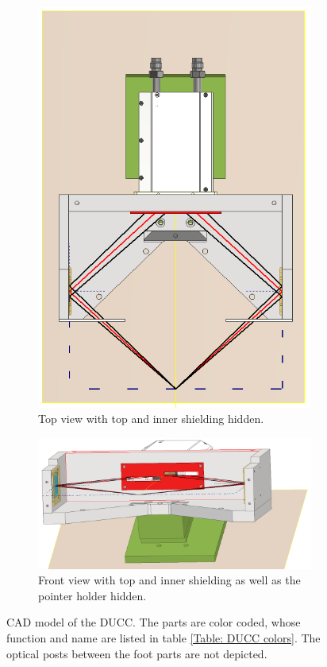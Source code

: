 \begin{figure} [H]
\begin{subfigure}[t]{0.35\textwidth}
		\includegraphics[width=\textwidth]{InventorPics/DUCCTopWoCover.PNG}
		\caption{Top view with top and inner shielding hidden.}
		\label{InvDUCCPartTop}
	\end{subfigure}%
	\hfill
	\begin{subfigure}[t]{0.63\textwidth}
	\centering
		\includegraphics[width=\textwidth]{InventorPics/DUCCFilterView.PNG}
		\caption{Front view with top and inner shielding as well 
		as the pointer 
		holder hidden.}
		\label{InvDUCCPartFilter}
	\end{subfigure}
	\caption{CAD model of the DUCC. The parts are color coded, 
	whose 
	function and name are listed in table \ref{Table: DUCC 
	colors}.
	The optical posts between the foot parts are not depicted.}
	\label{InvDUCC}
\end{figure}

